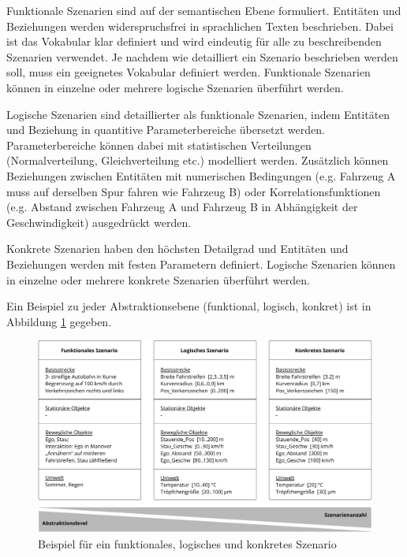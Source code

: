 Funktionale Szenarien sind auf der semantischen Ebene formuliert. Entitäten und Beziehungen werden widerspruchsfrei in sprachlichen Texten beschrieben. Dabei ist das Vokabular klar definiert und wird eindeutig für alle zu beschreibenden Szenarien verwendet. Je nachdem wie detailliert ein Szenario beschrieben werden soll, muss ein geeignetes Vokabular definiert werden. Funktionale Szenarien können in einzelne oder mehrere logische Szenarien überführt werden.

Logische Szenarien sind detaillierter als funktionale Szenarien, indem  Entitäten und Beziehung in quantitive Parameterbereiche übersetzt werden. Parameterbereiche können dabei mit statistischen Verteilungen (Normalverteilung, Gleichverteilung etc.) modelliert werden. Zusätzlich können Beziehungen zwischen Entitäten mit numerischen Bedingungen (e.g. Fahrzeug A muss auf derselben Spur fahren wie Fahrzeug B) oder Korrelationsfunktionen (e.g. Abstand zwischen Fahrzeug A und Fahrzeug B in Abhängigkeit der Geschwindigkeit) ausgedrückt werden.

Konkrete Szenarien haben den höchsten Detailgrad und Entitäten und Beziehungen werden mit festen Parametern definiert. Logische Szenarien können in einzelne oder mehrere konkrete Szenarien überführt werden.

Ein Beispiel zu jeder Abstraktionsebene (funktional, logisch, konkret) ist in Abbildung \ref{fig_funktional_logisch_konrekt} gegeben.

\begin{figure}[h]
\centering
\includegraphics[scale=0.5]{images/funktional_logisch_konrekt.pdf}
\caption{Beispiel für ein funktionales, logisches und konkretes Szenario \cite{bagschik2017szenarien}}
\label{fig_funktional_logisch_konrekt}
\end{figure}



